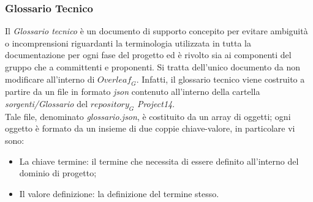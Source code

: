 \subsubsection{Glossario Tecnico}
Il \emph{Glossario tecnico} è un documento di supporto concepito per evitare ambiguità o incomprensioni riguardanti la terminologia utilizzata in tutta la documentazione per ogni fase del progetto ed è rivolto sia ai componenti del gruppo che a committenti e proponenti.
Si tratta dell'unico documento da non modificare all'interno di $\textit{Overleaf}_G$. Infatti, il glossario tecnico viene costruito a partire da un file in formato \emph{json} contenuto all'interno della cartella \emph{sorgenti/Glossario} del $\textit{repository}_G$ \emph{Project14}.\\
Tale file, denominato \emph{glossario.json}, è costituito da un array di oggetti; ogni oggetto è formato da un insieme di due coppie chiave-valore, in particolare vi sono:
\begin{itemize}
    \item La chiave termine: il termine che necessita di essere definito all'interno del dominio di progetto;
    \item Il valore definizione: la definizione del termine stesso.
\end{itemize}
